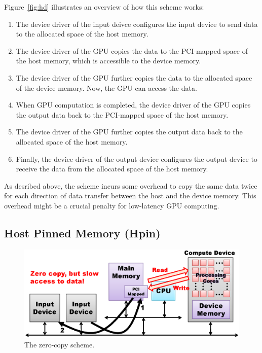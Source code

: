 Figure~\ref{fig:hd} illustrates an overview of how this scheme works:
\begin{enumerate}
 \item The device driver of the input deivce configures the input device
       to send data to the allocated space of the host memory.
 \item The device driver of the GPU copies the data to the
       PCI-mapped space of the host memory, which is accessible to the
       device memory.
 \item The device driver of the GPU further copies the data to the
       allocated space of the device memory.
       Now, the GPU can access the data.
 \item When GPU computation is completed, the device driver of the
       GPU copies the output data back to the PCI-mapped space of the
       host memory.
 \item The device driver of the GPU further copies the output data back
       to the allocated space of the host memory.
 \item Finally, the device driver of the output device configures the
       output device to receive the data from the allocated space of the
       host memory.
\end{enumerate}

As desribed above, the {\hd} scheme incurs some overhead to copy the
same data twice for each direction of data transfer between the host and
the device memory.
This overhead might be a crucial penalty for low-latency GPU computing.

\subsection{Host Pinned Memory (Hpin)}
\label{sec:hp}

\begin{figure}[!t]
 \centering
 \includegraphics[width=\hsize]{eps/hp.eps}
 \caption{The zero-copy {\hp} scheme.}
 \label{fig:hp}
\end{figure}

